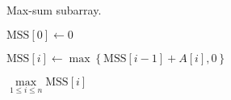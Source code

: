 
\begin{algorithm}[H]
  \caption{Max-sum subarray.}
  \label{mss-origin}
  \begin{algorithmic}[1]
      \State $\text{MSS}[0] \gets 0$

      \hStatex
	\State $\text{MSS}[i] \gets \max\left\{\text{MSS}[i-1] + A[i], 0\right\}$
      \EndFor

      \hStatex
      \State \Return $\max\limits_{1 \le i \le n} \text{MSS}[i]$
    \EndProcedure
  \end{algorithmic}
\end{algorithm}
